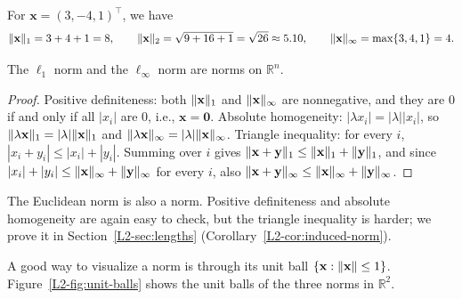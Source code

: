 \begin{example}
    For $\mathbf{x} = (3, -4, 1)^\top$, we have
    \[\lVert \mathbf{x} \rVert_1 = 3 + 4 + 1 = 8, \qquad \lVert \mathbf{x} \rVert_2 = \sqrt{9 + 16 + 1} = \sqrt{26} \approx 5.10, \qquad \lVert \mathbf{x} \rVert_\infty = \max\{3, 4, 1\} = 4.\]
\end{example}

\begin{proposition}\label{L2-prop:l1-linf}
    The $\ell_1$ norm and the $\ell_\infty$ norm are norms on $\mathbb{R}^n$.
\end{proposition}

\begin{proof}
    Positive definiteness: both $\lVert \mathbf{x} \rVert_1$ and $\lVert \mathbf{x} \rVert_\infty$ are nonnegative, and they are $0$ if and only if all $|x_i|$ are $0$, i.e., $\mathbf{x} = \mathbf{0}$. Absolute homogeneity: $|\lambda x_i| = |\lambda| |x_i|$, so $\lVert \lambda \mathbf{x} \rVert_1 = |\lambda| \lVert \mathbf{x} \rVert_1$ and $\lVert \lambda \mathbf{x} \rVert_\infty = |\lambda| \lVert \mathbf{x} \rVert_\infty$. Triangle inequality: for every $i$, $|x_i + y_i| \leq |x_i| + |y_i|$. Summing over $i$ gives $\lVert \mathbf{x} + \mathbf{y} \rVert_1 \leq \lVert \mathbf{x} \rVert_1 + \lVert \mathbf{y} \rVert_1$, and since $|x_i| + |y_i| \leq \lVert \mathbf{x} \rVert_\infty + \lVert \mathbf{y} \rVert_\infty$ for every $i$, also $\lVert \mathbf{x} + \mathbf{y} \rVert_\infty \leq \lVert \mathbf{x} \rVert_\infty + \lVert \mathbf{y} \rVert_\infty$.
\end{proof}

The Euclidean norm is also a norm. Positive definiteness and absolute homogeneity are again easy to check, but the triangle inequality is harder; we prove it in Section~\ref{L2-sec:lengths} (Corollary~\ref{L2-cor:induced-norm}).

A good way to visualize a norm is through its unit ball $\{\mathbf{x} : \lVert \mathbf{x} \rVert \leq 1\}$. Figure~\ref{L2-fig:unit-balls} shows the unit balls of the three norms in $\mathbb{R}^2$.

